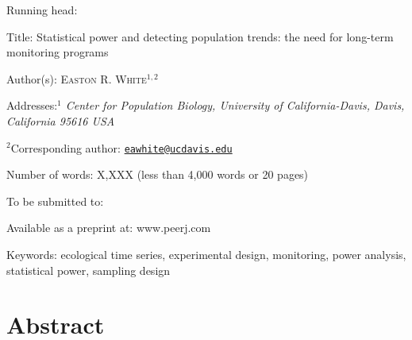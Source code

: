 \documentclass[12pt,]{article}
\title{}
\author{}
\date{}
\begin{document}
Running head: \vspace{3 mm}

Title: Statistical power and detecting population trends: the need for
long-term monitoring programs \vspace{7 mm}

Author(s): \textsc{Easton R. White$^{1,2}$} \vspace{3 mm}

Addresses:\emph{$^1$ Center for Population Biology, University of California-Davis, Davis, California 95616 USA}
\vspace{3 mm}

\(^2\)Corresponding author:
\href{mailto:eawhite@ucdavis.edu}{\nolinkurl{eawhite@ucdavis.edu}}
\vspace{3 mm}

Number of words: X,XXX (less than 4,000 words or 20 pages) \vspace{3 mm}

To be submitted to: \vspace{3 mm}

Available as a preprint at: www.peerj.com \vspace{3 mm}

Keywords: ecological time series, experimental design, monitoring, power
analysis, statistical power, sampling design

\vspace{3 mm}

\pagebreak 

\linenumbers

\section{Abstract}\label{abstract}
\end{document}
